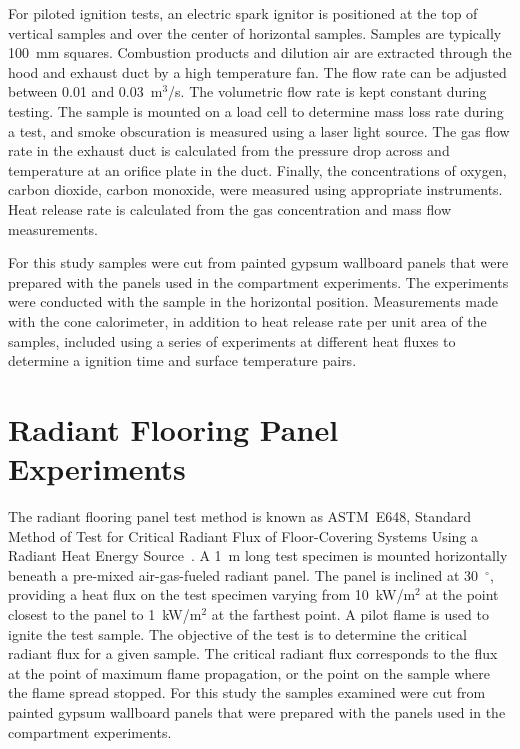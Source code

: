 \documentclass[twoside]{uocthesis}
\begin{document}
{{For piloted ignition tests, an electric spark ignitor is positioned at the top of vertical samples and over the center of horizontal samples. Samples are typically 100~mm squares. Combustion products and dilution air are extracted through the hood and exhaust duct by a high temperature fan. The flow rate can be adjusted between 0.01 and 0.03~m$^3$/s. The volumetric flow rate is kept constant during testing. The sample is mounted on a load cell to determine mass loss rate during a test, and smoke obscuration is measured using a laser light source. The gas flow rate in the exhaust duct is calculated from the pressure drop across and temperature at an orifice plate in the duct. Finally, the concentrations of oxygen, carbon dioxide, carbon monoxide, were measured using appropriate instruments. Heat release rate is calculated from the gas concentration and mass flow measurements.

For this study samples were cut from painted gypsum wallboard panels that were prepared with the panels used in the compartment experiments. The experiments were conducted with the sample in the horizontal position.  Measurements made with the cone calorimeter, in addition to heat release rate per unit area of the samples, included using a series of experiments at different heat fluxes to determine a ignition time and surface temperature pairs.

\section{Radiant Flooring Panel Experiments}

The radiant flooring panel test method is known as ASTM~E648, Standard Method of Test for Critical Radiant Flux of Floor-Covering Systems Using a Radiant Heat Energy Source~\cite{ASTM_E648}. A 1~m long test specimen is mounted horizontally beneath a pre-mixed air-gas-fueled radiant panel. The panel is inclined at 30~$^{\circ}$, providing a heat flux on the test specimen varying from 10~kW/m$^2$ at the point closest to the panel to 1~kW/m$^2$ at the farthest point. A pilot flame is used to ignite the test sample. The objective of the test is to determine the critical radiant flux for a given sample.  The critical radiant flux corresponds to the flux at the point of maximum flame propagation, or the point on the sample where the flame spread stopped. For this study the samples examined were cut from painted gypsum wallboard panels that were prepared with the panels used in the compartment experiments.


}}
\end{document}
